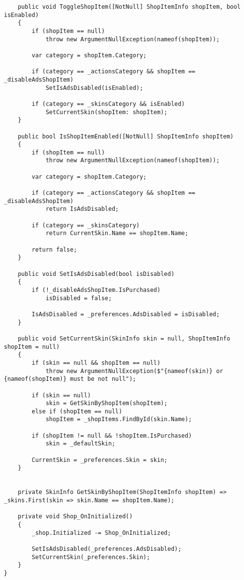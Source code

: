 \begin{lstlisting}
    public void ToggleShopItem([NotNull] ShopItemInfo shopItem, bool isEnabled)
    {
        if (shopItem == null)
            throw new ArgumentNullException(nameof(shopItem));

        var category = shopItem.Category;

        if (category == _actionsCategory && shopItem == _disableAdsShopItem)
            SetIsAdsDisabled(isEnabled);

        if (category == _skinsCategory && isEnabled)
            SetCurrentSkin(shopItem: shopItem);
    }

    public bool IsShopItemEnabled([NotNull] ShopItemInfo shopItem)
    {
        if (shopItem == null)
            throw new ArgumentNullException(nameof(shopItem));

        var category = shopItem.Category;

        if (category == _actionsCategory && shopItem == _disableAdsShopItem)
            return IsAdsDisabled;

        if (category == _skinsCategory)
            return CurrentSkin.Name == shopItem.Name;

        return false;
    }

    public void SetIsAdsDisabled(bool isDisabled)
    {
        if (!_disableAdsShopItem.IsPurchased)
            isDisabled = false;

        IsAdsDisabled = _preferences.AdsDisabled = isDisabled;
    }

    public void SetCurrentSkin(SkinInfo skin = null, ShopItemInfo shopItem = null)
    {
        if (skin == null && shopItem == null)
            throw new ArgumentNullException($"{nameof(skin)} or {nameof(shopItem)} must be not null");

        if (skin == null)
            skin = GetSkinByShopItem(shopItem);
        else if (shopItem == null)
            shopItem = _shopItems.FindById(skin.Name);

        if (shopItem != null && !shopItem.IsPurchased)
            skin = _defaultSkin;

        CurrentSkin = _preferences.Skin = skin;
    }


    private SkinInfo GetSkinByShopItem(ShopItemInfo shopItem) => _skins.First(skin => skin.Name == shopItem.Name);

    private void Shop_OnInitialized()
    {
        _shop.Initialized -= Shop_OnInitialized;

        SetIsAdsDisabled(_preferences.AdsDisabled);
        SetCurrentSkin(_preferences.Skin);
    }
}
\end{lstlisting}